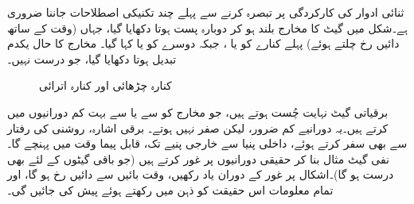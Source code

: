 ثنائی ادوار کی کارکردگی پر تبصرہ کرنے سے پہلے چند تکنیکی اصطلاحات جاننا ضروری ہے۔شکل  میں گیٹ کا مخارج بلند ہو کر دوبارہ پست ہوتا دکھایا گیا، جہاں (وقت  کے ساتھ دائیں رخ چلتے ہوئے) پہلے کنارے کو  یا  ، جبکہ دوسرے کو  یا  کہا گیا۔ مخارج کا حال یکدم تبدیل ہوتا دکھایا گیا، جو درست نہیں۔
\begin{figure}
\centering
{}
\caption{کنارہ چڑھائی اور کنارہ اترائی}
\label{شکل_ترتیبی_کنارے}
\end{figure}

برقیاتی گیٹ نہایت چُست ہوتے ہیں، جو مخارج کو  سے  یا  سے  بہت کم دورانیوں میں کرتے ہیں۔یہ دورانیے کم ضرور، لیکن صفر نہیں ہوتے۔ برقی اشارہ، روشنی کی رفتار سے بھی سفر کرتے ہوئے، داخلی پنیا سے خارجی پنیے تک، قابل پیما وقت میں پہنچے گا۔ نفی گیٹ مثال بنا کر حقیقی دورانیوں پر غور کرتے ہیں (جو باقی گیٹوں کے لئے بھی درست ہو گا)۔اشکال پر غور کے دوران یاد رکھیں، وقت بائیں سے دائیں رخ ہو گا، اور تمام معلومات اس حقیقت کو ذہن میں رکھتے ہوئے پیش کی جائیں گی۔

